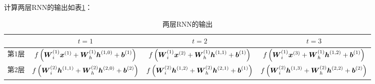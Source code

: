 \documentclass{../notes}
\begin{document}
    计算两层RNN的输出如表\ref{tbl:rnn-result-1}：

    \begin{table}[ht]
        \centering
        \small
        \caption{两层RNN的输出}
        \begin{tabular}{cccc}
            \toprule
            & $t = 1$ & $t = 2$ & $t = 3$ \\
            \midrule
            第1层 & $f\left(\boldsymbol W^{(1)}_i \boldsymbol x^{(1)} + \boldsymbol W^{(1)}_h \boldsymbol h^{(1, 0)} + \boldsymbol b^{(1)}\right) $ & $f\left(\boldsymbol W^{(1)}_i \boldsymbol x^{(2)} + \boldsymbol W^{(1)}_h \boldsymbol h^{(1, 1)} + \boldsymbol b^{(1)}\right) $ & $f\left(\boldsymbol W^{(1)}_i \boldsymbol x^{(3)} + \boldsymbol W^{(1)}_h \boldsymbol h^{(1, 2)} + \boldsymbol b^{(1)}\right)$ \\
            第2层 & $f\left(\boldsymbol W^{(2)}_i \boldsymbol h^{(1, 1)} + \boldsymbol W^{(2)}_h \boldsymbol h^{(2, 0)} + \boldsymbol b^{(2)}\right)$ & $f\left(\boldsymbol W^{(2)}_i \boldsymbol h^{(1, 2)} + \boldsymbol W^{(2)}_h \boldsymbol h^{(2, 1)} + \boldsymbol b^{(1)}\right)$ & $f\left(\boldsymbol W^{(2)}_i \boldsymbol h^{(1, 3)} + \boldsymbol W^{(2)}_h \boldsymbol h^{(2, 2)} + \boldsymbol b^{(2)}\right)$ \\
            \bottomrule
        \end{tabular}
        \label{tbl:rnn-result-1}
    \end{table}
\end{document}
